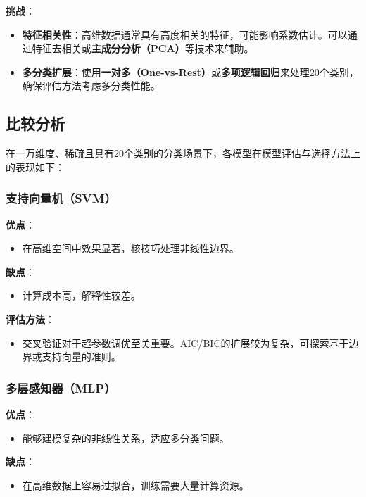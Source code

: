 \documentclass[11pt,a4paper]{article}
\begin{document}
\textbf{挑战}：

\begin{itemize}
    \item \textbf{特征相关性}：高维数据通常具有高度相关的特征，可能影响系数估计。可以通过特征去相关或\textbf{主成分分析（PCA）}等技术来辅助。
    \item \textbf{多分类扩展}：使用\textbf{一对多（One-vs-Rest）}或\textbf{多项逻辑回归}来处理20个类别，确保评估方法考虑多分类性能。
\end{itemize}

\subsection{比较分析}

在一万维度、稀疏且具有20个类别的分类场景下，各模型在模型评估与选择方法上的表现如下：

\subsubsection{支持向量机（SVM）}

\textbf{优点}：
\begin{itemize}
    \item 在高维空间中效果显著，核技巧处理非线性边界。
\end{itemize}

\textbf{缺点}：
\begin{itemize}
    \item 计算成本高，解释性较差。
\end{itemize}

\textbf{评估方法}：
\begin{itemize}
    \item 交叉验证对于超参数调优至关重要。AIC/BIC的扩展较为复杂，可探索基于边界或支持向量的准则。
\end{itemize}

\subsubsection{多层感知器（MLP）}

\textbf{优点}：
\begin{itemize}
    \item 能够建模复杂的非线性关系，适应多分类问题。
\end{itemize}

\textbf{缺点}：
\begin{itemize}
    \item 在高维数据上容易过拟合，训练需要大量计算资源。
\end{itemize}
\end{document}
